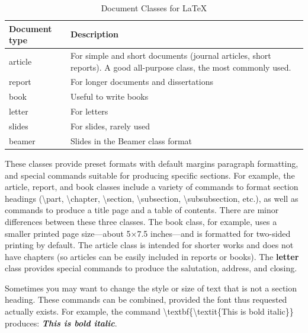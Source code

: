 \documentclass[12pt,openright]{book}
\begin{document}
\begin{table}[!htbp]
  \caption{Document Classes for \LaTeX}
  \label{tab:document type}
  \begin{tabular}{@{}lp{}@{}}
    \toprule
    \textbf{Document type} & \textbf{Description} \\
    \midrule
    article  &  For simple and short documents (journal articles, short reports). A good all-purpose class, the most commonly used. \\
    report & For longer documents and dissertations \\
    book & Useful to write books \\
    letter & For letters \\
    slides & For slides, rarely used \\
    beamer & Slides in the Beamer class format \\
    \bottomrule
  \end{tabular}
\end{table}
  
These classes provide preset formats with default margins paragraph formatting, and special commands suitable for producing specific sections. For example, the article, report, and book classes include a variety of commands to format section headings
(\textbackslash part, \textbackslash chapter, \textbackslash section, \textbackslash subsection, \textbackslash subsubsection, etc.), as well as commands to produce a title page and a table of contents. There are minor differences between these three classes. The book class, for example, uses a smaller printed page size—about 5×7.5 inches—and is formatted for two-sided printing by default. The article class is intended for shorter works and does not have chapters (so articles can be easily included in reports or books). The \textbf{letter} class provides special commands to produce the salutation, address, and closing.

Sometimes you may want to change the style or size of text that is not a section heading. These commands can be combined, provided the font thus requested actually exists. For example, the command \textbackslash textbf\{\textbackslash textit\{This is bold italic\}\} produces: \textbf{\textit{This is bold italic}}.
\end{document}
